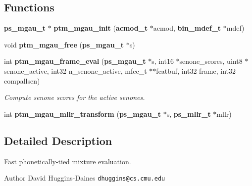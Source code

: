 \subsection*{Functions}
\begin{DoxyCompactItemize}
\item 
{\bf ps\+\_\+mgau\+\_\+t} $\ast$ {\bfseries ptm\+\_\+mgau\+\_\+init} ({\bf acmod\+\_\+t} $\ast$acmod, {\bf bin\+\_\+mdef\+\_\+t} $\ast$mdef)\label{ptm__mgau_8h_a712679ca84e5b9f7351d969abbe1021a}

\item 
void {\bfseries ptm\+\_\+mgau\+\_\+free} ({\bf ps\+\_\+mgau\+\_\+t} $\ast$s)\label{ptm__mgau_8h_ac202aeb266594ab9c98294a73e16f00a}

\item 
int {\bf ptm\+\_\+mgau\+\_\+frame\+\_\+eval} ({\bf ps\+\_\+mgau\+\_\+t} $\ast$s, int16 $\ast$senone\+\_\+scores, uint8 $\ast$senone\+\_\+active, int32 n\+\_\+senone\+\_\+active, mfcc\+\_\+t $\ast$$\ast$featbuf, int32 frame, int32 compallsen)\label{ptm__mgau_8h_ae9fb76ef388e6541bd6c1b20fe8bc094}

\begin{DoxyCompactList}\small\item\em Compute senone scores for the active senones. \end{DoxyCompactList}\item 
int {\bfseries ptm\+\_\+mgau\+\_\+mllr\+\_\+transform} ({\bf ps\+\_\+mgau\+\_\+t} $\ast$s, {\bf ps\+\_\+mllr\+\_\+t} $\ast$mllr)\label{ptm__mgau_8h_ad619b68c9db5e2fed688f62ea4468c4e}

\end{DoxyCompactItemize}


\subsection{Detailed Description}
Fast phonetically-\/tied mixture evaluation. 

\begin{DoxyAuthor}{Author}
David Huggins-\/\+Daines {\tt dhuggins@cs.\+cmu.\+edu} 
\end{DoxyAuthor}
